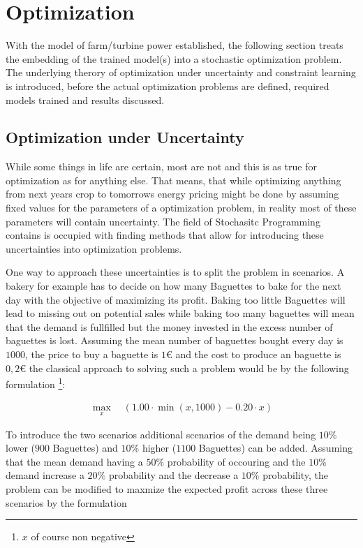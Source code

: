 
\chapter{Optimization}\label{section:optimization}

With the model of farm/turbine power established, the following section treats the embedding of the trained model(s)  into a stochastic optimization problem. The underlying therory of optimization under uncertainty and constraint learning is introduced, before the actual optimization problems are defined, required models trained and results discussed.

\section{Optimization under Uncertainty}

While some things in life are certain, most are not and this is as true for optimization as for anything else. That means, that while optimizing anything from next years crop to tomorrows energy pricing might be done by assuming fixed values for the parameters of a optimization problem, in reality most of these parameters will contain uncertainty. The field of Stochasitc Programming contains is occupied with finding methods that allow for introducing these uncertainties into optimization problems.

One way to approach these uncertainties is to split the problem in scenarios. A bakery for example has to decide on how many Baguettes to bake for the next day with the objective of maximizing its profit. Baking too little Baguettes will lead to missing out on potential sales while baking too many baguettes will mean that the demand is fullfilled but the money invested in the excess number of baguettes is lost. Assuming the mean number of baguettes bought every day is $1000$, the price to buy a baguette is $1 €$ and the cost to produce an baguette is $0,2 €$ the classical approach to solving such a problem would be by the following formulation \footnote{$x$ of course non negative}: 


\begin{align*}
	\max_{x} \quad \left( 1.00 \cdot \min(x,1000) - 0.20 \cdot x \right)
\end{align*}


To introduce the two scenarios additional scenarios of the demand being $10\%$ lower ($900$ Baguettes) and $10\%$ higher ($1100$ Baguettes) can be added. Assuming that the mean demand having a $50\%$ probability of occouring and the $10\%$ demand increase a $20\%$ probability and the decrease a $10\%$  probability, the problem can be modified to maxmize the expected profit across these three scenarios by the formulation

